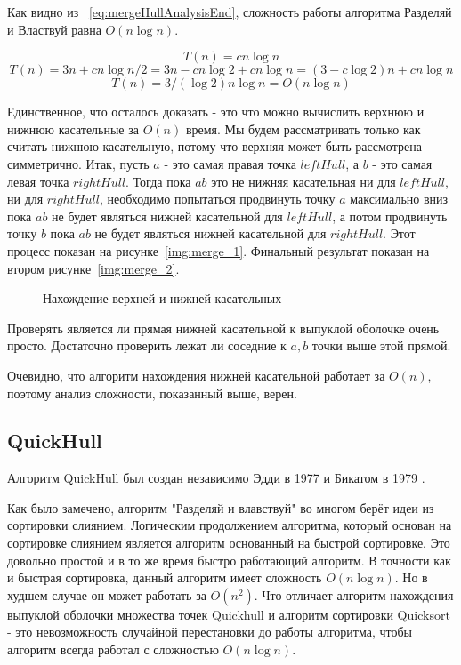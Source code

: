 Как видно из ~\ref{eq:mergeHullAnalysisEnd}, сложность работы алгоритма Разделяй и Властвуй равна $O(n \log n)$.

\[
T(n) = cn \log n
\]
\[
T(n) = 3n + cn \log n/2 = 3n - cn \log 2 + cn \log n = (3 - c \log 2)n + cn \log n
\]
\begin{equation}\label{eq:mergeHullAnalysisEnd}
T(n) = 3/(\log 2)n \log n = O(n \log n)
\end{equation}

Единственное, что осталось доказать - это что можно вычислить верхнюю и нижнюю касательные за $O(n)$ время. Мы будем рассматривать только как считать нижнюю касательную, потому что верхняя может быть рассмотрена симметрично. Итак, пусть $a$ - это самая правая точка $leftHull$, а $b$ - это самая левая точка $rightHull$. Тогда пока $ab$ это не нижняя касательная ни для $leftHull$, ни для $rightHull$, необходимо попытаться продвинуть точку $a$ максимально вниз пока $ab$ не будет являться нижней касательной для $leftHull$, а потом продвинуть точку $b$ пока $ab$ не будет являться нижней касательной для $rightHull$. Этот процесс показан на рисунке~\ref{img:merge_1}. Финальный результат показан на втором рисунке~\ref{img:merge_2}.

\begin{figure}[H]
	{\centering
		\hfill
		\subbottom[\label{img:merge_1}]{%
			}
		\hfill
		\subbottom[\label{img:merge_2}]{%
			}
		\hfill
	}
	\caption{Нахождение верхней и нижней касательных}
	\label{img:merge}
\end{figure}


Проверять является ли прямая нижней касательной к выпуклой оболочке очень просто. Достаточно проверить лежат ли соседние к $a, b$ точки выше этой прямой.

Очевидно, что алгоритм нахождения нижней касательной работает за $O(n)$, поэтому анализ сложности, показанный выше, верен.

\subsection{QuickHull} \label{subsect1_1_4}

Алгоритм QuickHull был создан независимо Эдди в 1977 и Бикатом в 1979 \cite{barber1996Quickhull}.

Как было замечено, алгоритм "Разделяй и влавствуй" во многом берёт идеи из сортировки слиянием. Логическим продолжением алгоритма, который основан на сортировке слиянием является алгоритм основанный на быстрой сортировке. Это довольно простой и в то же время быстро работающий алгоритм. В точности как и быстрая сортировка, данный алгоритм имеет сложность $O(n \log n)$. Но в худшем случае он может работать за $O(n^2)$. Что отличает алгоритм нахождения выпуклой оболочки множества точек Quickhull и алгоритм сортировки Quicksort - это невозможность случайной перестановки до работы алгоритма, чтобы алгоритм всегда работал с сложностью $O(n \log n)$.

